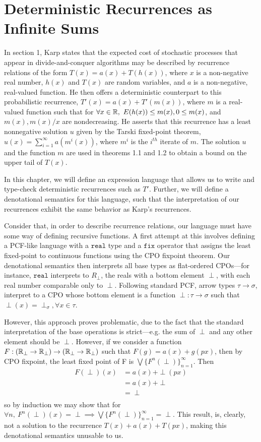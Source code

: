 \chapter{Deterministic Recurrences as Infinite Sums}
In section 1, Karp states that the expected cost of stochastic processes that appear in divide-and-conquer algorithms may be 
described by
recurrence relations of the form $T(x) = a(x) + T(h(x))$, where $x$ is a non-negative real number, $h(x)$ and $T(x)$ are 
random variables, and $a$ is a non-negative, real-valued function. He then offers a deterministic counterpart to this
probabilistic recurrence, $T'(x) = a(x) + T'(m(x))$, where $m$ is a real-valued function such that for 
$\forall x \in \mathbb{R}, \ E(h(x)) \leq m(x) , 0 \leq m(x)$, and $m(x), m(x)/x$ are nondecreasing. He asserts that this recurrence 
has a least nonnegative solution $u$ given by the Tarski fixed-point theorem, $u(x) = \sum_{i=1}^{\infty}a(m^i(x))$, where 
$m^i$ is the $i^{th}$ iterate of $m$. The solution $u$ and the function $m$ are used in theorems 1.1 and 1.2 to obtain a 
bound on the upper tail of $T(x)$.

In this chapter, we will define an expression language that allows us to write and type-check
deterministic recurrences such as $T'$. Further, we will define a denotational semantics for this language, 
such that the interpretation of our recurrences exhibit the same behavior as Karp's recurrences. 

Consider that, in order to describe recurrence relations, our language must have some way of defining recursive functions.
A first attempt at this involves defining a PCF-like language with a $\texttt{real}$ type and a $\texttt{fix}$ operator
that assigns the least fixed-point to continuous functions using the CPO fixpoint theorem. Our denotational semantics 
then interprets all base types as flat-ordered CPOs---for instance, $\texttt{real}$  interprets to $R_{\perp}$, the reals with a 
bottom element $\perp$, with each real number comparable only to $\perp$. Following standard PCF, arrow types
$\tau \rightarrow \sigma$, interpret to a CPO whose bottom element is a function $\perp: \tau \rightarrow \sigma$ such
that $\perp(x) = \perp_{\sigma}, \forall x \in \tau$.

However, this approach proves problematic, due to the fact that the standard interpretation of the base operations is strict---e.g. the 
sum of $\perp$ and any other element should be $\perp$. However, if we consider a function $F: (\mathbb{R}_{\perp} \rightarrow 
\mathbb{R}_{\perp}) \rightarrow (\mathbb{R}_{\perp} \rightarrow \mathbb{R}_{\perp})$ such that $F(g) = a(x) + g(px)$, then by CPO fixpoint, the least 
fixed point of F is $\bigvee\{F^n(\perp)\}^{\infty}_{n=1}$. Then 
\begin{align*}
F(\perp)(x) &= a(x) + \perp(px)\\
&= a(x) + \perp \\
&= \perp \\
\end{align*}
so by induction we may show that for $\forall n, \ F^n(\perp)(x) = \perp \implies \bigvee\{F^n(\perp)\}^{\infty}_{n=1}  = \perp$. 
This result, is, clearly, not a solution to the recurrence $T(x) + a(x) + T(px)$, making this denotational semantics
unusable to us. 

